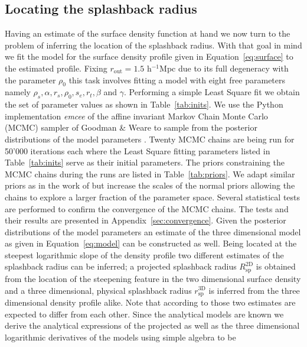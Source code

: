 \documentclass[a4paper,fleqn,usenatbib]{mnras}
\begin{document}
\subsection{Locating the splashback radius}
\label{sec:MCMC}
Having an estimate of the surface density function at hand we now turn to the problem of inferring the location of the splashback radius. With that goal in mind we fit the model for the surface density profile given in Equation~\ref{eq:surface} to the estimated profile. Fixing $r_{\mathrm{out}}=1.5 $ h$^{-1}$Mpc due to its full degeneracy with the parameter $\rho_0$ this task involves fitting a model with eight free parameters namely $\rho_s, \alpha, r_s, \rho_0, s_e, r_t, \beta$ and $\gamma$. 
Performing a simple Least Square fit we obtain the set of parameter values as shown in Table~\ref{tab:inits}. We use the Python implementation \textit{emcee} \citep{foreman2013emcee} of the affine invariant Markov Chain Monte Carlo (MCMC) sampler of Goodman \& Weare to sample from the posterior distributions of the model parameters \citep{goodman2010ensemble}. Twenty MCMC chains are being run for 50'000 iterations each where the Least Square fitting parameters listed in Table~\ref{tab:inits} serve as their initial parameters. 
The priors constraining the MCMC chains during the runs are listed in Table~\ref{tab:priors}. We adapt similar priors as in the work of \citet{more2016detection} but increase the scales of the normal priors allowing the chains to explore a larger fraction of the parameter space.
Several statistical tests are performed to confirm the convergence of the MCMC chains. The tests and their results are presented in Appendix~\ref{sec:convergence}. Given the posterior distributions of the model parameters an estimate of the three dimensional model as given in Equation~\ref{eq:model} can be constructed as well. 
Being located at the steepest logarithmic slope of the density profile two different estimates of the splashback radius can be inferred; a projected splashback radius $R_{\mathrm{sp}}^{\mathrm{2D}}$ is obtained from the location of the steepening feature in the two dimensional surface density and a three dimensional, physical splashback radius $r^{\mathrm{3D}}_{\mathrm{sp}}$ is inferred from the three dimensional density profile alike. Note that according to \citet{diemer2014dependence} those two estimates are expected to differ from each other.
Since the analytical models are known we derive the analytical expressions of the projected as well as the three dimensional logarithmic derivatives of the models using simple algebra to be
\end{document}

